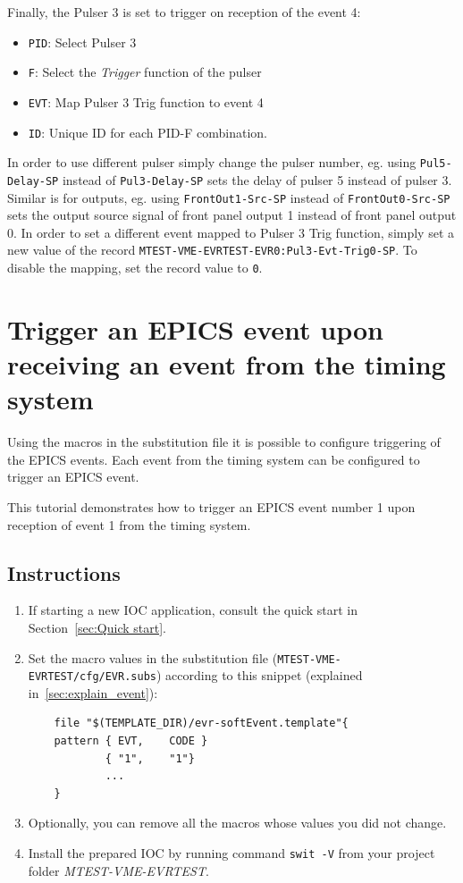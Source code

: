 \documentclass[12pt,a4paper]{article}
\begin{document}
Finally, the Pulser 3 is set to trigger on reception of the event 4:
\begin{itemize}
	\item \texttt{PID}: Select Pulser 3
	\item \texttt{F}: Select the \textit{Trigger} function of the pulser
	\item \texttt{EVT}: Map Pulser 3 Trig function to event 4
	\item \texttt{ID}: Unique ID for each PID-F combination.
\end{itemize}

In order to use different pulser simply change the pulser number, eg. using \texttt{Pul5-Delay-SP} instead of \texttt{Pul3-Delay-SP} sets the delay of pulser 5 instead of pulser 3.
Similar is for outputs, eg. using \texttt{FrontOut1-Src-SP} instead of \texttt{FrontOut0-Src-SP} sets the output source signal of front panel output 1 instead of front panel output 0. In order to set a different event mapped to Pulser 3 Trig function, simply set a new value of the record \texttt{MTEST-VME-EVRTEST-EVR0:Pul3-Evt-Trig0-SP}. To disable the mapping, set the record value to \texttt{0}.

\section{Trigger an EPICS event upon receiving an event from the timing system}
Using the macros in the substitution file it is possible to configure triggering of the EPICS events. Each event from the timing system can be configured to trigger an EPICS event.

This tutorial demonstrates how to trigger an EPICS event number 1 upon reception of event 1 from the timing system.

\subsection{Instructions}
\begin{enumerate}
	\item If starting a new IOC application, consult the quick start in Section~\ref{sec:Quick start}.
	
	\item Set the macro values in the substitution file (\texttt{MTEST-VME-EVRTEST/cfg/EVR.subs}) according to this snippet (explained in~\ref{sec:explain_event}):
\begin{verbatim}
	file "$(TEMPLATE_DIR)/evr-softEvent.template"{
	pattern { EVT,    CODE }
	        { "1",    "1"}
	        ...
	}
\end{verbatim}
	\item Optionally, you can remove all the macros whose values you did not change. 

	\item Install the prepared IOC by running command \texttt{swit -V} from your project folder \textit{MTEST-VME-EVRTEST}.
\end{enumerate}
\end{document}
